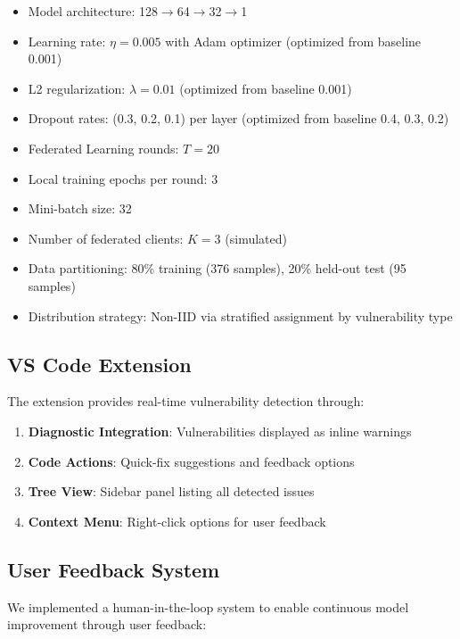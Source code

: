 \documentclass[conference]{IEEEtran}
\begin{document}
\begin{itemize}
    \item Model architecture: 128$\rightarrow$64$\rightarrow$32$\rightarrow$1
    \item Learning rate: $\eta = 0.005$ with Adam optimizer (optimized from baseline 0.001)
    \item L2 regularization: $\lambda = 0.01$ (optimized from baseline 0.001)
    \item Dropout rates: (0.3, 0.2, 0.1) per layer (optimized from baseline 0.4, 0.3, 0.2)
    \item Federated Learning rounds: $T = 20$
    \item Local training epochs per round: 3
    \item Mini-batch size: 32
    \item Number of federated clients: $K = 3$ (simulated)
    \item Data partitioning: 80\% training (376 samples), 20\% held-out test (95 samples)
    \item Distribution strategy: Non-IID via stratified assignment by vulnerability type
\end{itemize}

\subsection{VS Code Extension}

The extension provides real-time vulnerability detection through:

\begin{enumerate}
    \item \textbf{Diagnostic Integration}: Vulnerabilities displayed as inline warnings
    \item \textbf{Code Actions}: Quick-fix suggestions and feedback options
    \item \textbf{Tree View}: Sidebar panel listing all detected issues
    \item \textbf{Context Menu}: Right-click options for user feedback
\end{enumerate}

\subsection{User Feedback System}

We implemented a human-in-the-loop system to enable continuous model improvement through user feedback:
\end{document}

